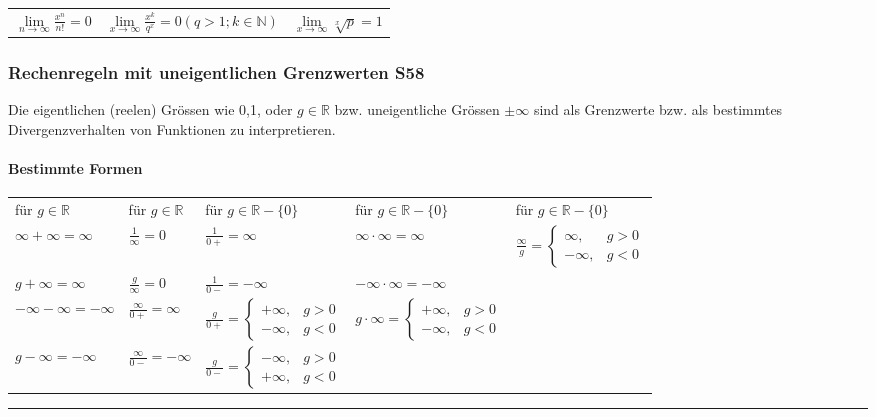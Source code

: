 \documentclass[6pt,a4paper]{scrartcl}
\begin{document}
\begin{multicols*}{2}
\begin{tabulary}{14cm}{LLL}
	$\lim\limits_{n\to\infty}\frac{x^{n}}{n!}=0$ 					& $\lim\limits_{x\to\infty}\frac{x^{k}}{q^{x}}=0 (q>1;k\in\mathbb{N})$ 					&
	$\lim\limits_{x\to\infty}\sqrt[x]{p}=1$	\\
\end{tabulary}

\subsubsection{Rechenregeln mit uneigentlichen Grenzwerten \color{red}S58}
Die eigentlichen (reelen) Grössen wie 0,1, oder $g\in \mathbb R$ bzw. uneigentliche Grössen $\pm\infty$ sind als Grenzwerte bzw. als bestimmtes Divergenzverhalten von Funktionen zu interpretieren.

\paragraph{Bestimmte Formen}
\begin{tabulary}{14cm}{LLLLL}
für $g\in \mathbb R$	&	für $g\in \mathbb R$	&	für $g\in \mathbb R-\{0\}$	&	für $g\in \mathbb R-\{0\}$	&	für $g\in \mathbb R-\{0\}$\\
$\infty+\infty=\infty$	&$\frac{1}{\infty}=0$		&	$\frac{1}{0+}=\infty$& $\infty\cdot \infty=\infty$& $\frac{\infty}{g}= \begin{cases} \infty, & g>0 \\ -\infty,& g<0 \end{cases}$ \\


$g+\infty=\infty$		&$\frac{g}{\infty}=0$		&	$\frac{1}{0-}=-\infty$& $-\infty\cdot \infty=-\infty$ &  \\
$-\infty-\infty=-\infty$&$\frac{\infty}{0+}=\infty$	& $\frac{g}{0+}= \begin{cases} +\infty, & g>0 \\ -\infty,& g<0 \end{cases}$ &
$g\cdot \infty= \begin{cases} +\infty, & g>0 \\ -\infty,& g<0 \end{cases}$ & \\

$g-\infty=-\infty$		&$\frac{\infty}{0-}=-\infty$& $\frac{g}{0-}= \begin{cases} -\infty, & g>0 \\ +\infty,& g<0 \end{cases}$ & &\\
\end{tabulary}
\hrule

\end{multicols*}
\end{document}
